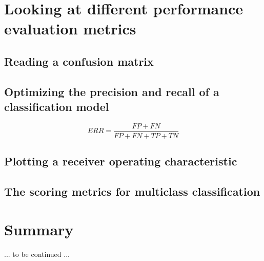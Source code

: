 \documentclass[letterpaper]{report}
\begin{document}
\section{Looking at different performance evaluation metrics}
\subsection{Reading a confusion matrix}
\subsection{Optimizing the precision and recall of a classification model}

\[
ERR = \frac{FP + FN}{FP + FN + TP + TN}
\]

\subsection{Plotting a receiver operating characteristic}
\subsection{The scoring metrics for multiclass classification}
\section{Summary}


\newpage

... to be continued ... 




\newpage
\end{document}
